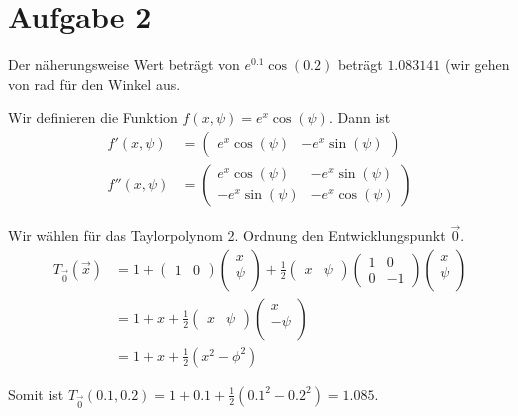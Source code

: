 \documentclass[10pt,a4paper,parskip=half]{scrartcl}
\newcommand{\vectwo}[2]{\begin{pmatrix}#1\\#2\\\end {pmatrix}}
\begin{document}
\section*{Aufgabe 2}
Der näherungsweise Wert beträgt von  $e^{0.1}\cos(0.2)$ beträgt $1.083141$ (wir gehen von rad für den Winkel aus.

Wir definieren die Funktion $f(x,\psi) = e^x\cos(\psi)$. Dann ist
\begin{align*}
f'(x,\psi) &= 
\begin{pmatrix}
e^x\cos(\psi) & -e^x\sin(\psi)
\end{pmatrix} \\
f''(x,\psi) &= 
\begin{pmatrix}
e^x\cos(\psi) & -e^x\sin(\psi) \\
-e^x\sin(\psi) & -e^x\cos(\psi)
\end{pmatrix}
\end{align*}


Wir wählen für das Taylorpolynom 2. Ordnung den Entwicklungspunkt $\vec 0$.
\begin{align*} 
T_{\vec 0}(\vec x) &= 1 + \begin{pmatrix}1 & 0\end{pmatrix}\vectwo{x}{\psi} +\frac{1}{2} \begin{pmatrix}x & \psi\end{pmatrix}
\begin{pmatrix}
1 & 0 \\
0 & -1
\end{pmatrix}
\vectwo{x}{\psi} \\
&= 1 + x + \frac{1}{2}\begin{pmatrix}x & \psi\end{pmatrix}\vectwo{x}{-\psi} \\
&= 1 + x + \frac{1}{2}(x^2 - \phi^2)
\end{align*}

Somit ist $T_{\vec 0}(0.1, 0.2) = 1 + 0.1 + \frac{1}{2}(0.1^2 - 0.2^2) = 1.085$.
\end{document}
